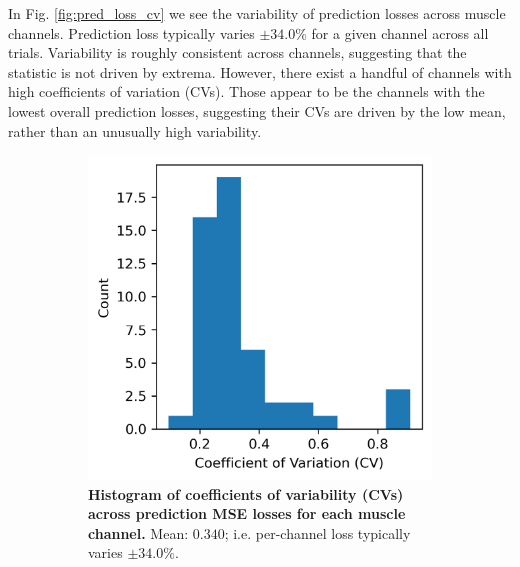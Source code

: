 \documentclass[12pt]{iopart}
\begin{document}
In Fig. \ref{fig:pred_loss_cv} we see the variability of prediction losses across muscle
channels. Prediction loss typically varies $\pm34.0\%$ for a given channel across all
trials. Variability is roughly consistent across channels, suggesting that the statistic
is not driven by extrema. However, there exist a handful of channels with high
coefficients of variation (CVs). Those appear to be the channels with the lowest overall
prediction losses, suggesting their CVs are driven by the low mean, rather than an unusually
high variability.

\begin{figure}
	\centering
	\begin{subfigure}[c]{0.48\textwidth}
		\centering
		\includegraphics[width=\textwidth]{pred_loss_cv_hist.png}
		\caption{\textbf{Histogram of coefficients of variability (CVs) across prediction MSE
                 losses for each muscle channel.} Mean: $0.340$; i.e. per-channel loss
                 typically varies $\pm34.0\%$.}
	\end{subfigure}
	\hfill
	\begin{subfigure}[c]{0.48\textwidth}
		\centering

\end{subfigure}
\end{figure}
\end{document}
